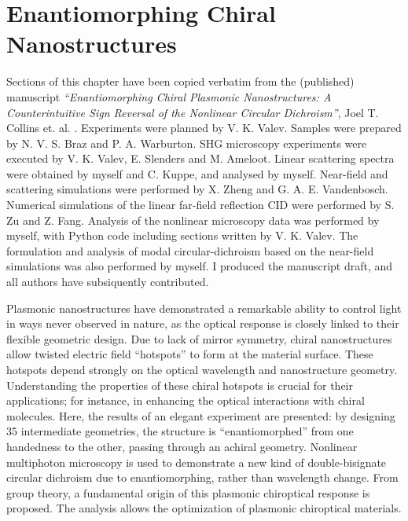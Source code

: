 \chapter{Enantiomorphing Chiral Nanostructures}\label{sec:results:EnantiomorphingChiralCrosses}


Sections of this chapter have been copied verbatim from the (published) manuscript \textit{``Enantiomorphing Chiral Plasmonic Nanostructures: A Counterintuitive Sign Reversal of the Nonlinear Circular Dichroism''}, Joel T. Collins et. al. \cite{Collins2018}. 
Experiments were planned by V. K. Valev. Samples were prepared by N. V. S. Braz and P. A. Warburton. SHG microscopy experiments were executed by V. K. Valev, E. Slenders and M. Ameloot. Linear scattering spectra were obtained by myself and C. Kuppe, and analysed by myself. Near-field and scattering simulations were performed by X. Zheng and G. A. E. Vandenbosch. Numerical simulations of the linear far-field reflection CID were performed by S. Zu and Z. Fang. 
Analysis of the nonlinear microscopy data was performed by myself, with Python code including sections written by V. K. Valev. The formulation and analysis of modal circular-dichroism based on the near-field simulations was also performed by myself. I produced the manuscript draft, and all authors have subsiquently contributed. 

\bigskip \noindent
Plasmonic nanostructures have demonstrated a remarkable ability to control light in ways never observed in nature, as the optical response is closely linked to their flexible geometric design.
Due to lack of mirror symmetry, chiral nanostructures allow twisted electric field ``hotspots'' to form at the material surface. 
These hotspots depend strongly on the optical wavelength and nanostructure geometry.
Understanding the properties of these chiral hotspots is crucial for their applications; for instance, in enhancing the optical interactions with chiral molecules. 
Here, the results of an elegant experiment are presented: by designing 35 intermediate geometries, the structure is ``enantiomorphed'' from one handedness to the other, passing through an achiral geometry. 
Nonlinear multiphoton microscopy is used to demonstrate a new kind of double-bisignate circular dichroism due to enantiomorphing, rather than wavelength change.
From group theory, a fundamental origin of this plasmonic chiroptical response is proposed. The analysis allows the optimization of plasmonic chiroptical materials.

